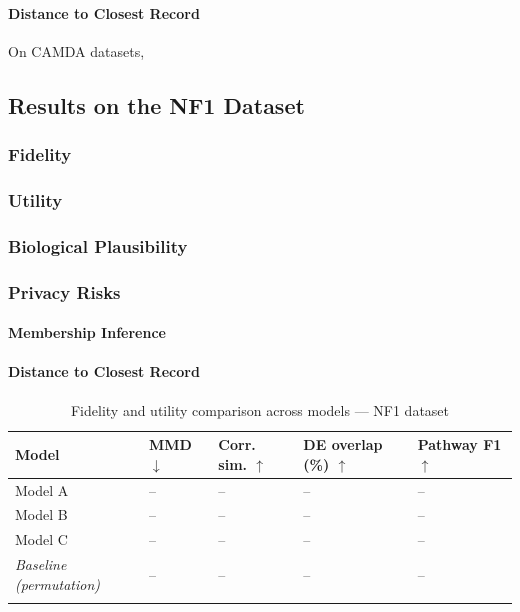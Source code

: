 \documentclass[webpdf,contemporary,large]{oup-authoring-template}%
\theoremstyle{thmstyleone}%
\theoremstyle{thmstyletwo}%
\theoremstyle{thmstylethree}%
\begin{document}
\paragraph{Distance to Closest Record}


\begin{findingbox}[title={CAMDA Datasets, }]
  On CAMDA datasets, 

\end{findingbox}

\subsection{Results on the NF1 Dataset}

\subsubsection{Fidelity}


\subsubsection{Utility}

\subsubsection{Biological Plausibility}

\subsubsection{Privacy Risks}
\paragraph{Membership Inference}
\paragraph{Distance to Closest Record}





\begin{table}[!t]
\caption{Fidelity and utility comparison across models — NF1 dataset\label{tab:nf1_results}}
\begin{tabular}{L{2.5cm} C{2cm} C{2cm} C{2.5cm} C{2.5cm}}
  \toprule
  \textbf{Model} & \textbf{MMD $\downarrow$} & \textbf{Corr. sim. $\uparrow$} & \textbf{DE overlap (\%) $\uparrow$} & \textbf{Pathway F1 $\uparrow$} \\
  \midrule
  Model A        & --  & --  & --  & -- \\
  Model B        & --  & --  & --  & -- \\
  Model C        & --  & --  & --  & -- \\
  \midrule
  \textit{Baseline (permutation)} & -- & -- & -- & -- \\
  \botrule
\end{tabular}
\end{table}
\end{document}
